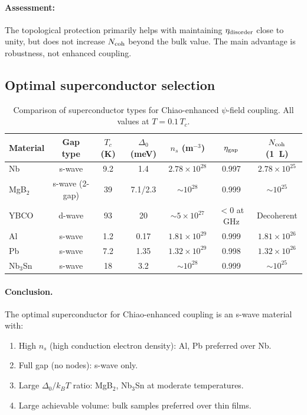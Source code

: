 \documentclass[12pt,aps,prd,twocolumn,superscriptaddress,nofootinbib]{revtex4-2}
\newcommand{\ee}[1]{\times 10^{#1}}
\begin{document}
\paragraph{Assessment:} The topological protection primarily
helps with maintaining $\eta_{\rm disorder}$ close to unity, but
does not increase $N_{\rm coh}$ beyond the bulk value. The main
advantage is robustness, not enhanced coupling.

\subsection{Optimal superconductor selection}

\begin{table}[t]
\caption{Comparison of superconductor types for Chiao-enhanced
$\psi$-field coupling. All values at $T = 0.1\,T_c$.}
\label{tab:SC-comparison}
\begin{ruledtabular}
\begin{tabular}{lcccccc}
Material & Gap type & $T_c$ (K) & $\Delta_0$ (meV) & $n_s$ (m$^{-3}$)
& $\eta_{\rm gap}$ & $N_{\rm coh}$ (1~L) \\
\hline
Nb & s-wave & 9.2 & 1.4 & $2.78\ee{28}$ & 0.997 & $2.78\ee{25}$ \\
MgB$_2$ & s-wave (2-gap) & 39 & 7.1/2.3 & $\sim 10^{28}$ & 0.999 & $\sim 10^{25}$ \\
YBCO & d-wave & 93 & 20 & $\sim 5\ee{27}$ & $<0$ at GHz & Decoherent \\
Al & s-wave & 1.2 & 0.17 & $1.81\ee{29}$ & 0.999 & $1.81\ee{26}$ \\
Pb & s-wave & 7.2 & 1.35 & $1.32\ee{29}$ & 0.998 & $1.32\ee{26}$ \\
Nb$_3$Sn & s-wave & 18 & 3.2 & $\sim 10^{28}$ & 0.999 & $\sim 10^{25}$ \\
\end{tabular}
\end{ruledtabular}
\end{table}

\paragraph{Conclusion.} The optimal superconductor for Chiao-enhanced
coupling is an s-wave material with:
\begin{enumerate}[nosep]
\item High $n_s$ (high conduction electron density): Al, Pb preferred
over Nb.
\item Full gap (no nodes): s-wave only.
\item Large $\Delta_0/k_BT$ ratio: MgB$_2$, Nb$_3$Sn at moderate
temperatures.
\item Large achievable volume: bulk samples preferred over thin films.
\end{enumerate}
\end{document}
